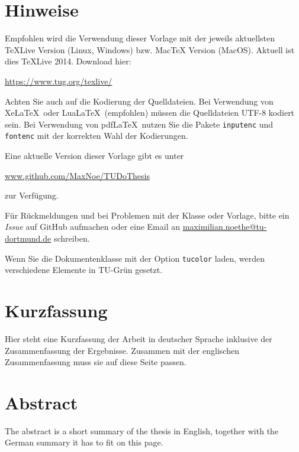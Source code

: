 \thispagestyle{plain}

\section*{Hinweise}
Empfohlen wird die Verwendung dieser Vorlage mit der jeweils aktuellsten TeXLive Version (Linux, Windows) bzw. MacTeX Version (MacOS).
Aktuell ist dies TeXLive 2014. Download hier: 
\begin{center}
  \href{https://www.tug.org/texlive/}{https://www.tug.org/texlive/}
\end{center}

Achten Sie auch auf die Kodierung der Quelldateien.
Bei Verwendung von Xe\LaTeX\ oder Lua\LaTeX\ (empfohlen) müssen die
Quelldateien UTF-8 kodiert sein.
Bei Verwendung von pdf\LaTeX\ nutzen Sie die Pakete \texttt{inputenc} und \texttt{fontenc} mit der korrekten Wahl der Kodierungen.

Eine aktuelle Version dieser Vorlage gibt es unter 
\begin{center}
  \href{https://github.com/MaxNoe/TUDoThesis}{www.github.com/MaxNoe/TUDoThesis}
\end{center}
zur Verfügung.

Für Rückmeldungen und bei Problemen mit der Klasse oder Vorlage, bitte ein \emph{Issue} auf GitHub aufmachen oder eine Email an
\href{mailto:maximilian.noethe@tu-dortmund.de}{maximilian.noethe@tu-dortmund.de} schreiben.

Wenn Sie die Dokumentenklasse mit der Option \texttt{tucolor} laden, werden verschiedene Elemente in TU-Grün gesetzt.

\section*{Kurzfassung}
Hier steht eine Kurzfassung der Arbeit in deutscher Sprache inklusive der Zusammenfassung der
Ergebnisse.
Zusammen mit der englischen Zusammenfassung muss sie auf diese Seite passen.

\section*{Abstract}
\begin{english}
The abstract is a short summary of the thesis in English, together with the German summary it has to fit on this page.
\end{english}
